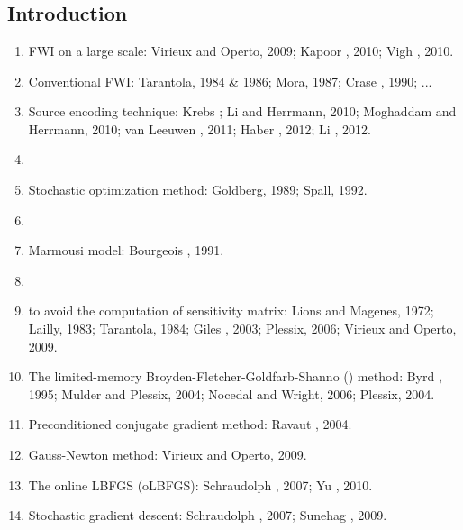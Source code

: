 \renewcommand{\pmk}{Moghaddam\_2013\_Geophy\_Stochastic gradient method}
\renewcommand{\prf}{FWI/\pmk.pdf}
\renewcommand{\pti}{A new optimizatioin approach for source-encoding full-waveform inversion}
\renewcommand{\pay}{Peyman P. Moghaddam, Henk Keers, Felix J. Herrmann, \etal, 2013}
\renewcommand{\pjo}{Geophysics}
\renewcommand{\pda}{2017/6/11 Sun.}

\section{\pinfo}
\subsection{Introduction}
\begin{enumerate}[\hspace{10mm}*]
  \item FWI on a large scale: Virieux and Operto, 2009; Kapoor \etal, 2010; Vigh \etal, 2010.
  \item Conventional FWI: Tarantola, 1984 \& 1986; Mora, 1987; Crase \etal, 1990; ...
  \item Source encoding technique: Krebs ; Li and Herrmann, 2010;
    Moghaddam and Herrmann, 2010; van Leeuwen \etal, 2011; Haber \etal, 2012; Li \etal, 2012.
  \item \sline
  \item Stochastic optimization method: Goldberg, 1989; Spall, 1992.
  \item \sline
  \item Marmousi model: Bourgeois \etal, 1991.
  \item \sline
  \item {} to avoid the computation of sensitivity matrix:
    Lions and Magenes, 1972; Lailly, 1983; Tarantola, 1984; Giles \etal, 2003;
    Plessix, 2006; Virieux and Operto, 2009.
  \item The limited-memory Broyden-Fletcher-Goldfarb-Shanno () method:
    Byrd \etal, 1995; Mulder and Plessix, 2004; Nocedal and Wright, 2006; Plessix, 2004.
  \item Preconditioned conjugate gradient method: Ravaut \etal, 2004.
  \item Gauss-Newton method: Virieux and Operto, 2009.
  \item The online LBFGS (oLBFGS): Schraudolph \etal, 2007; Yu \etal, 2010.
  \item Stochastic gradient descent: Schraudolph \etal, 2007; Sunehag \etal, 2009.
\end{enumerate}

